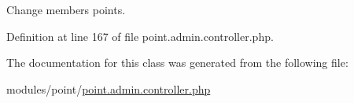 Change members points. 



Definition at line 167 of file point.\+admin.\+controller.\+php.



The documentation for this class was generated from the following file\+:\begin{DoxyCompactItemize}
\item 
modules/point/\hyperlink{point_8admin_8controller_8php}{point.\+admin.\+controller.\+php}\end{DoxyCompactItemize}
